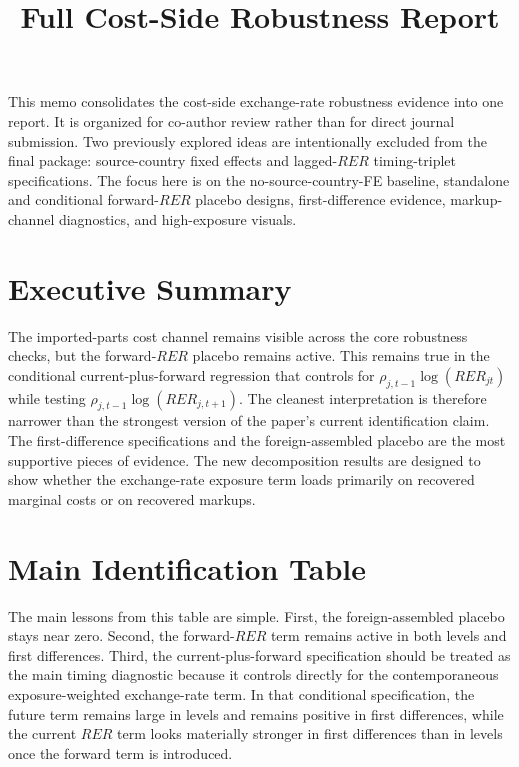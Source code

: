 \documentclass[11pt]{article}
\title{Full Cost-Side Robustness Report}
\date{}
\begin{document}
\maketitle

This memo consolidates the cost-side exchange-rate robustness evidence into one report. It is organized for co-author review rather than for direct journal submission. Two previously explored ideas are intentionally excluded from the final package: source-country fixed effects and lagged-\(RER\) timing-triplet specifications. The focus here is on the no-source-country-FE baseline, standalone and conditional forward-\(RER\) placebo designs, first-difference evidence, markup-channel diagnostics, and high-exposure visuals.

\section*{Executive Summary}

The imported-parts cost channel remains visible across the core robustness checks, but the forward-\(RER\) placebo remains active. This remains true in the conditional current-plus-forward regression that controls for \(\rho_{j,t-1}\log(RER_{jt})\) while testing \(\rho_{j,t-1}\log(RER_{j,t+1})\). The cleanest interpretation is therefore narrower than the strongest version of the paper's current identification claim. The first-difference specifications and the foreign-assembled placebo are the most supportive pieces of evidence. The new decomposition results are designed to show whether the exchange-rate exposure term loads primarily on recovered marginal costs or on recovered markups.

\section*{Main Identification Table}



The main lessons from this table are simple. First, the foreign-assembled placebo stays near zero. Second, the forward-\(RER\) term remains active in both levels and first differences. Third, the current-plus-forward specification should be treated as the main timing diagnostic because it controls directly for the contemporaneous exposure-weighted exchange-rate term. In that conditional specification, the future term remains large in levels and remains positive in first differences, while the current \(RER\) term looks materially stronger in first differences than in levels once the forward term is introduced.
\end{document}
